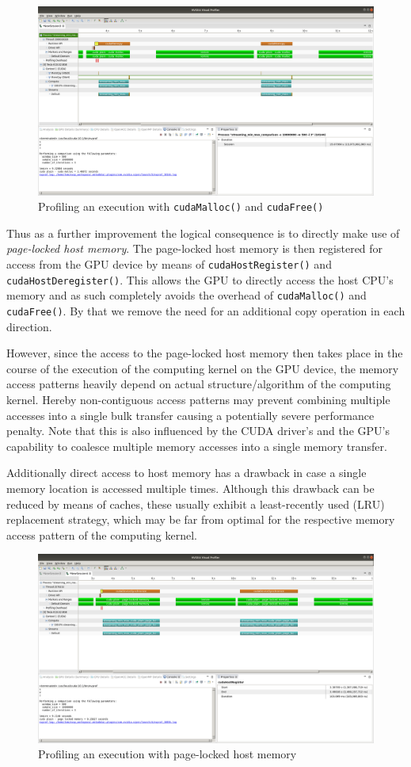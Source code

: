 \begin{figure}[h]
    \centering
    \includegraphics[width=0.8\linewidth]{Figures/memory_malloc}
    \caption{Profiling an execution with \texttt{cudaMalloc()} and \texttt{cudaFree()} \label{fig:memory_malloc}}
\end{figure}

Thus as a further improvement the logical consequence is to directly make use of \emph{page-locked host memory}. The page-locked host memory is then registered for access from the GPU device by means of \texttt{cudaHostRegister()} and \texttt{cudaHostDeregister()}. This allows the GPU to directly access the host CPU's memory and as such completely avoids the overhead of \texttt{cudaMalloc()} and \texttt{cudaFree()}. By that we remove the need for an additional copy operation in each direction.

However, since the access to the page-locked host memory then takes place in the course of the execution of the computing kernel on the GPU device, the memory access patterns heavily depend on actual structure/algorithm of the computing kernel. Hereby non-contiguous access patterns may prevent combining multiple accesses into a single bulk transfer causing a potentially severe performance penalty. Note that this is also influenced by the CUDA driver's and the GPU's capability to coalesce multiple memory accesses into a single memory transfer. 

Additionally direct access to host memory has a drawback in case a single memory location is accessed multiple times. Although this drawback can be reduced by means of caches, these usually exhibit a least-recently used (LRU) replacement strategy, which may be far from optimal for the respective memory access pattern of the computing kernel.

\begin{figure}[h]
    \centering
    \includegraphics[width=0.8\linewidth]{Figures/memory_page_locked}
    \caption{Profiling an execution with page-locked host memory \label{fig:memory_page_locked}}
\end{figure}

